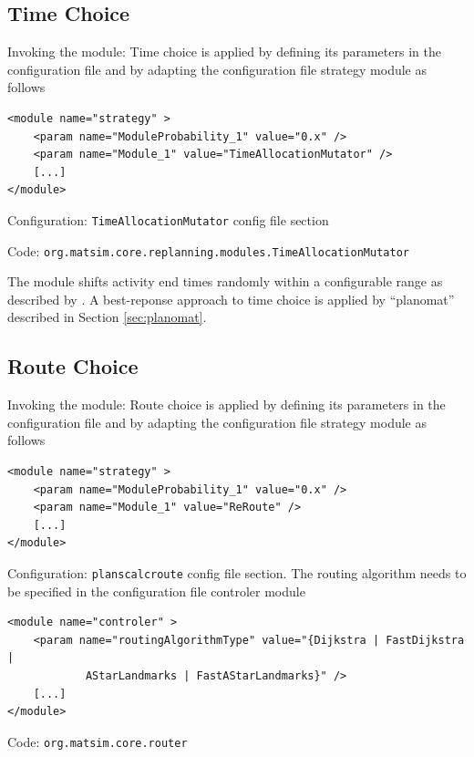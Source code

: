 \subsection{Time Choice}
\label{sec:timechoice}
\begin{compactitem}
\item Invoking the module: Time choice is applied by defining its parameters in the configuration file and by adapting the configuration file strategy module as follows
%
\begin{lstlisting}
<module name="strategy" >
    <param name="ModuleProbability_1" value="0.x" />
    <param name="Module_1" value="TimeAllocationMutator" />
    [...]
</module>
\end{lstlisting}
%
\item Configuration: \lstinline|TimeAllocationMutator| config file section
\item Code: \lstinline|org.matsim.core.replanning.modules.TimeAllocationMutator|
\end{compactitem}

The module shifts activity end times randomly within a configurable range as described by \citet[][]{BalmerEtAl_Timmermans_2005, Raney_PhDThesis_2005, Balmer_unpub_VSP_2004, BalmerEtAl_unpub_EIRASS_2004, BalmerEtAl_unpub_STRC_2004}. A best-reponse approach to time choice is applied by ``planomat'' described in Section \ref{sec:planomat}.

\subsection{Route Choice}
\label{sec:routechoice}
\begin{compactitem}
\item Invoking the module: Route choice is applied by defining its parameters in the configuration file and by adapting the configuration file strategy module as follows
%
\begin{lstlisting}
<module name="strategy" >
    <param name="ModuleProbability_1" value="0.x" />
    <param name="Module_1" value="ReRoute" />
    [...]
</module>
\end{lstlisting}
%
\item Configuration: \lstinline|planscalcroute| config file section. The routing algorithm needs to be specified in the configuration file controler module
%
\begin{lstlisting}
<module name="controler" >
    <param name="routingAlgorithmType" value="{Dijkstra | FastDijkstra |
    		AStarLandmarks | FastAStarLandmarks}" />
    [...]
</module>
\end{lstlisting}
\item Code: \lstinline|org.matsim.core.router|
\end{compactitem}

